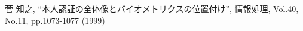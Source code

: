 \documentclass[12pt,twoside]{jreport}  %
\begin{document}
\setcounter{page}{1}   %
\tableofcontents       %
\listoffigures         %
\listoftables          %
\newpage


\setcounter{page}{1}     %

\setlength{\baselineskip}{20pt}



% 





\newpage

\begin{thebibliography}{99}%
 菅 知之, “本人認証の全体像とバイオメトリクスの位置付け”, 情報処理, Vol.40, No.11, pp.1073-1077 (1999)
\end{thebibliography}
\end{document}
